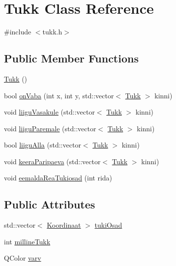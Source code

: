 \hypertarget{class_tukk}{}\section{Tukk Class Reference}
\label{class_tukk}


{\ttfamily \#include $<$tukk.\+h$>$}

\subsection*{Public Member Functions}
\begin{DoxyCompactItemize}
\item 
\mbox{\hyperlink{class_tukk_ae488ab9342984c0cd8423bad2a2b6aaf}{Tukk}} ()
\item 
bool \mbox{\hyperlink{class_tukk_a9a473bdd35032215c19fb5de1ed34fbd}{on\+Vaba}} (int x, int y, std\+::vector$<$ \mbox{\hyperlink{class_tukk}{Tukk}} $>$ kinni)
\item 
void \mbox{\hyperlink{class_tukk_aaea787c20a3f6069ddee1fcb8be824c2}{liigu\+Vasakule}} (std\+::vector$<$ \mbox{\hyperlink{class_tukk}{Tukk}} $>$ kinni)
\item 
void \mbox{\hyperlink{class_tukk_a92d79109e3751eb5475f878c791ff241}{liigu\+Paremale}} (std\+::vector$<$ \mbox{\hyperlink{class_tukk}{Tukk}} $>$ kinni)
\item 
bool \mbox{\hyperlink{class_tukk_adb3c531cf6fa683e4256c8794c24de78}{liigu\+Alla}} (std\+::vector$<$ \mbox{\hyperlink{class_tukk}{Tukk}} $>$ kinni)
\item 
void \mbox{\hyperlink{class_tukk_a0314e4600166d267c57877a3e504788f}{keera\+Paripaeva}} (std\+::vector$<$ \mbox{\hyperlink{class_tukk}{Tukk}} $>$ kinni)
\item 
void \mbox{\hyperlink{class_tukk_a942fbfd4046c0d89c86854915ecc1126}{eemalda\+Rea\+Tukiosad}} (int rida)
\end{DoxyCompactItemize}
\subsection*{Public Attributes}
\begin{DoxyCompactItemize}
\item 
std\+::vector$<$ \mbox{\hyperlink{struct_koordinaat}{Koordinaat}} $>$ \mbox{\hyperlink{class_tukk_a29cc3bf866c68aeaaee2cadcb496b9d3}{tuki\+Osad}}
\item 
int \mbox{\hyperlink{class_tukk_a5ac12a5f3cfa2dfea930e0bca00d6051}{milline\+Tukk}}
\item 
Q\+Color \mbox{\hyperlink{class_tukk_a7857976349b7db76f7d7d889404e9728}{varv}}
\end{DoxyCompactItemize}


